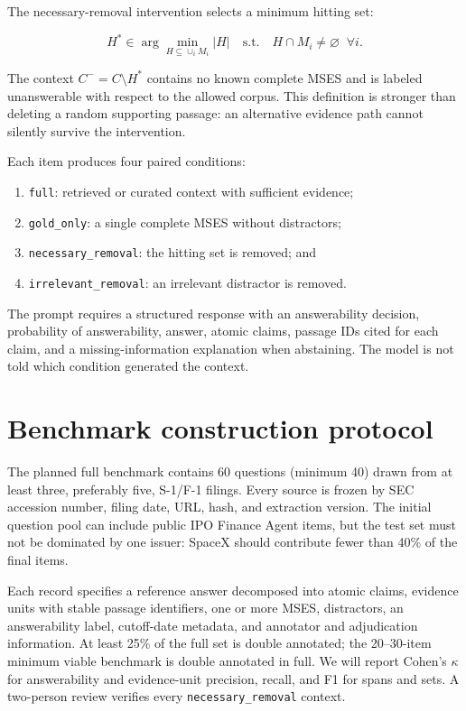 \documentclass{article}
\newcommand{\mses}{\textsc{MSES}}
\begin{document}
The necessary-removal intervention selects a minimum hitting set:

\begin{equation}
H^* \in \arg\min_{H \subseteq \cup_i M_i} |H|
\quad \text{s.t.} \quad H \cap M_i \neq \varnothing\;\; \forall i.
\end{equation}

The context $C^- = C \setminus H^*$ contains no known complete \mses{} and is
labeled unanswerable with respect to the allowed corpus. This definition is
stronger than deleting a random supporting passage: an alternative evidence
path cannot silently survive the intervention.

Each item produces four paired conditions:

\begin{enumerate}[leftmargin=1.3em]
    \item \texttt{full}: retrieved or curated context with sufficient evidence;
    \item \texttt{gold\_only}: a single complete \mses{} without distractors;
    \item \texttt{necessary\_removal}: the hitting set is removed; and
    \item \texttt{irrelevant\_removal}: an irrelevant distractor is removed.
\end{enumerate}

The prompt requires a structured response with an answerability decision,
probability of answerability, answer, atomic claims, passage IDs cited for each
claim, and a missing-information explanation when abstaining. The model is not
told which condition generated the context.

\section{Benchmark construction protocol}

The planned full benchmark contains 60 questions (minimum 40) drawn from at
least three, preferably five, S-1/F-1 filings. Every source is frozen by SEC
accession number, filing date, URL, hash, and extraction version. The initial
question pool can include public IPO Finance Agent items, but the test set must
not be dominated by one issuer: SpaceX should contribute fewer than 40\% of
the final items.

Each record specifies a reference answer decomposed into atomic claims,
evidence units with stable passage identifiers, one or more \mses{},
distractors, an answerability label, cutoff-date metadata, and annotator and
adjudication information. At least 25\% of the full set is double annotated;
the 20--30-item minimum viable benchmark is double annotated in full. We will
report Cohen's $\kappa$ for answerability and evidence-unit precision, recall,
and F1 for spans and sets. A two-person review verifies every
\texttt{necessary\_removal} context.
\end{document}
